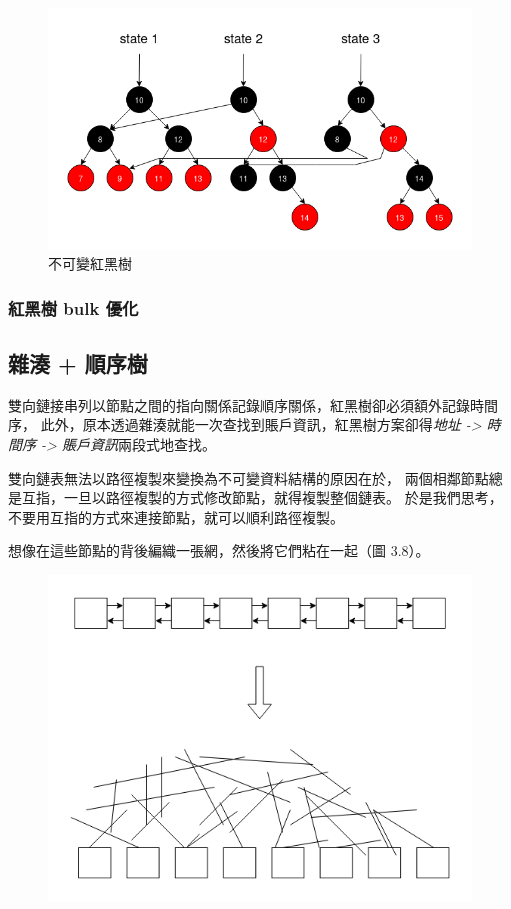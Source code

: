 \begin{figure}[h!]
\includegraphics[width=\textwidth]{不可變紅黑樹}
\caption{不可變紅黑樹}
\end{figure}

\subsubsection{紅黑樹 bulk 優化}

\subsection{雜湊 + 順序樹}

雙向鏈接串列以節點之間的指向關係記錄順序關係，紅黑樹卻必須額外記錄時間序，
此外，原本透過雜湊就能一次查找到賬戶資訊，紅黑樹方案卻得\emph{地址 -> 時間序 -> 賬戶資訊}兩段式地查找。

雙向鏈表無法以路徑複製來變換為不可變資料結構的原因在於，
兩個相鄰節點總是互指，一旦以路徑複製的方式修改節點，就得複製整個鏈表。
於是我們思考，不要用互指的方式來連接節點，就可以順利路徑複製。

想像在這些節點的背後編織一張網，然後將它們粘在一起（圖 3.8）。

\begin{figure}[h!]
\includegraphics[width=\textwidth]{節點網}
\caption{}
\end{figure}

